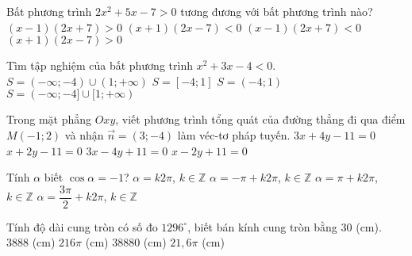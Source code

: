 \begin{ex}%
Bất phương trình $2 x^2 + 5x - 7 >0$ tương đương với bất phương trình nào? 
	\choice
	{\True $(x-1) (2x + 7) >0$}
	{$(x+1) (2x - 7) <0$}
	{$(x-1) (2x + 7) <0$}
	{$(x+1) (2x-7) >0$}
\end{ex}

\begin{ex}%
Tìm tập nghiệm của bất phương trình $x^2 + 3x - 4 < 0$. 
	\choice
	{$S= (-\infty; -4) \cup (1; +\infty)$}
	{$S= [-4; 1]$}
	{\True $S= (-4; 1)$}
	{$S= (-\infty; -4]  \cup [1; +\infty)$}
\end{ex}

\begin{ex}%
Trong mặt phẳng $O x y$, viết phương trình tổng quát của đường thẳng đi qua điểm $M (-1; 2)$ và nhận $\overrightarrow{n} = (3; -4)$ làm véc-tơ pháp tuyến. 
	\choice
	{$3x + 4y -11=0$}
	{$x + 2y -11=0$}
	{\True $3x-4y+11=0$}
	{$x-2y+11=0$}
\end{ex}

\begin{ex}%
Tính $\alpha$ biết $\cos \alpha = -1$? 
	\choice
	{$\alpha = k 2 \pi$, $k \in \mathbb Z$}
	{$\alpha = - \pi + k 2 \pi$, $k \in \mathbb Z$}
	{\True $\alpha = \pi + k 2 \pi$, $k \in \mathbb Z$}
	{$\alpha = \dfrac{3 \pi}{2} + k 2 \pi$, $k \in \mathbb Z$}
\end{ex}

\begin{ex}%
Tính độ dài cung tròn có số đo $1296^{\circ}$, biết bán kính cung tròn bằng $30$ (cm). 
	\choice
	{$3888$ (cm)}
	{\True $216 \pi$ (cm)}
	{$38 880$ (cm)}
	{$21,6 \pi$ (cm)}
\end{ex}

